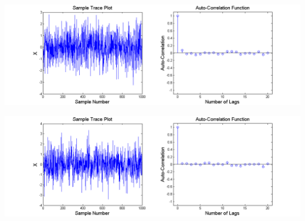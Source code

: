 \documentclass{article}
\begin{document}
\begin{center}
\includegraphics[scale=0.5]{FirstGibbsSamplerLessCorr.png}
\end{center}
\begin{center}
\includegraphics[scale=0.5]{SecondGibbsSamplerLessCorr.png}
\end{center}

\pagebreak
{}\\

\end{document}
